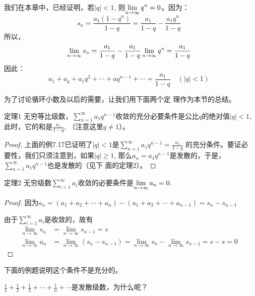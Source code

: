 \begin{solution}
    我们在本章中，已经证明，若$|q|<1$, 则$\displaystyle\lim_{n\to\infty}q^n=0$。因为：
\[s_n=\frac{a_1(1-q^n)}{1-q}=\frac{a_1}{1-q}-\frac{a_1q^n}{1-q}\]
所以，
\[\displaystyle\lim_{n\to\infty}s_n=\dfrac{a_1}{1-q}-\dfrac{a_1}{1-q}\displaystyle\lim_{n\to\infty}q^n=\dfrac{a_1}{1-q}\]
因此：\[a_1+a_q+a_1q^2+\cdots +aq^{n-1}+\cdots=\frac{a_1}{1-q} \quad (|q|<1)\]
\end{solution}

为了讨论循环小数及以后的需要，让我们用下面两个定
理作为本节的总结。

\begin{blk}{定理1}
    无穷等比级数，$\sum^{\infty}_{n=1}a_1q^{n-1}$收敛的充分必要条件是公比$q$的绝对值$|q|<1$, 此时，它的和是$\frac{a_1}{1-q}$, （注意这里$q\ne 1$）。
\end{blk}

\begin{proof}
    上面的例7.17已证明了$|q|<1$是$\sum^{\infty}_{n=1}a_1q^{n-1}=\frac{a_1}{1-q}$
的充分条件。要证必要性，我们只须注意到，如果$|q|\ge 1$, 
那么$a_n=a_1q^{n-1}$是发散的，于是，$\sum^{\infty}_{n=1}a_1q^{n-1}$也是发散的（见下
面的定理2）。
\end{proof}

\begin{blk}{定理2}
无穷级数$\sum^{\infty}_{i=1}a_i$收敛的必要条件是$\displaystyle\lim_{n\to \infty}a_n=0$.
\end{blk}

\begin{proof}
因为$a_n=(a_1+a_2+\cdots +a_n)-(a_1+a_2+\cdots +a_{n-1})
=s_n-s_{n-1}$

由于$\sum^{\infty}_{i=1}a_i$是收敛的，故有
\[\begin{split}
    \lim_{n\to\infty}s_n&=\lim_{n\to\infty}s_{n-1}=s\\
    \lim_{n\to\infty}a_n&=\lim_{n\to\infty}(s_n-s_{n-1})=\lim_{n\to\infty}s_n-\lim_{n\to\infty}s_{n-1}=s-s=0
\end{split}\]
\end{proof}

下面的例题说明这个条件不是充分的。


\begin{example}
    $\frac{1}{1}+\frac{1}{2}+\frac{1}{3}+\cdots +\frac{1}{n}+\cdots$是发散级数，为什么呢？
\end{example}


